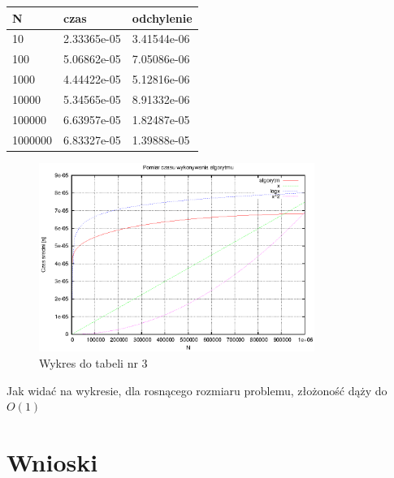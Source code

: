 \documentclass[a4paper,11pt]{article}
\begin{document}
\begin{enumerate}
\begin{table}[th]
      \begin{tabular}{|l|l|l|}
	\hline
	N & czas & odchylenie \\
    \hline
  10 & 2.33365e-05 &  3.41544e-06\\
  \hline
100 & 5.06862e-05 &  7.05086e-06\\
\hline
1000 & 4.44422e-05 &  5.12816e-06\\
\hline
10000 & 5.34565e-05 &  8.91332e-06\\
\hline
100000 & 6.63957e-05 &  1.82487e-05\\
\hline
1000000 & 6.83327e-05 &  1.39888e-05\\
\hline
    \end{tabular}
    \end{table}
    \newpage
\begin{figure}[th]
\centering
\includegraphics[width=0.8\textwidth]{../prj/wykres11.eps}
\caption{Wykres do tabeli nr 3}
\label{Wykres do tabeli nr 3}
\end{figure} 
Jak widać na wykresie, dla rosnącego rozmiaru problemu, złożoność dąży do $ O(1) $
\end{enumerate}

\section{Wnioski}
\end{document}

